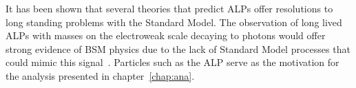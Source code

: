 It has been shown that several theories that predict ALPs offer resolutions to long standing problems with the Standard Model. The observation of long lived ALPs with masses on the electroweak scale decaying to photons would offer strong evidence of BSM physics due to the lack of Standard Model processes that could mimic this signal~\cite{Curtin_2014}. Particles such as the ALP serve as the motivation for the analysis presented in chapter~\ref{chap:ana}.